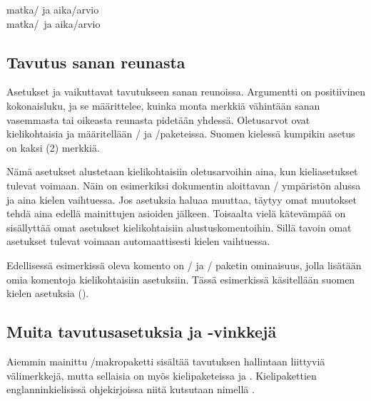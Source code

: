\begin{tulossis}
  matka\-/{} ja aika\-/arvio \\
  matka\-/\ ja aika\-/arvio
\end{tulossis}

\subsection{Tavutus sanan reunasta}

Asetukset  ja 
vaikuttavat tavutukseen sanan reunoissa. Argumentti  on
positiivinen kokonaisluku, ja se määrittelee, kuinka monta merkkiä
vähintään sanan vasemmasta tai oikeasta reunasta pidetään yhdessä.
Oletusarvot ovat kielikohtaisia ja määritellään
\-/{} ja \-/paketeissa. Suomen
kielessä kumpikin asetus on kaksi (2) merkkiä.

Nämä asetukset alustetaan kielikohtaisiin oletusarvoihin aina, kun
kieliasetukset tulevat voimaan. Näin on esimerkiksi dokumentin
aloittavan \-/ ympäristön alussa ja aina kielen
vaihtuessa. Jos asetuksia haluaa muuttaa, täytyy omat muutokset tehdä
aina edellä mainittujen asioiden jälkeen. Toisaalta vielä kätevämpää on
sisällyttää omat asetukset kielikohtaisiin alustuskomentoihin. Sillä
tavoin omat asetukset tulevat voimaan automaattisesti kielen vaihtuessa.

\begin{koodilohkosis}
\end{koodilohkosis}

Edellisessä esimerkissä oleva komento  on
\-/{} ja \-/ paketin ominaisuus,
jolla lisätään omia komentoja kielikohtaisiin asetuksiin. Tässä
esimerkissä käsitellään suomen kielen asetuksia
().

\subsection{Muita tavutusasetuksia ja -vinkkejä}
\label{luku:tavutus_muut}

Aiemmin mainittu \-/makropaketti sisältää tavutuksen
hallintaan liittyviä välimerkkejä, mutta sellaisia on myös
kielipaketeissa  ja . Kielipakettien
englanninkielisissä ohjekirjoissa niitä kutsutaan nimellä
\emph{}.

